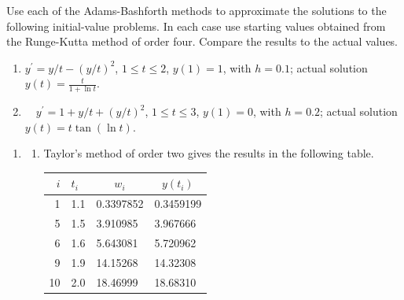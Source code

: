 \begin{posttest}
\item Use each of the Adams-Bashforth methods to approximate the solutions to the following initial-value problems. In each case use starting values obtained from the Runge-Kutta method of order four. Compare the results to the actual values.\\
\begin{enumerate}[label=(\alph*)]
\item $y^{\prime}=y / t-(y / t)^{2}$, $1 \leq t \leq 2$, $y(1)=1$, with $h=0.1$; actual solution $y(t)=\frac{t}{1+\ln t}$.\\
\item $\quad y^{\prime}=1+y / t+(y / t)^{2}$, $1 \leq t \leq 3$, $y(1)=0$, with $h=0.2$; actual solution $y(t)=t \tan (\ln t)$.
\end{enumerate}






\begin{mysolution}
\begin{enumerate}[label=\arabic*.]
\item 
\begin{enumerate}[label=(\alph*)]
\item Taylor's method of order two gives the results in the following table.

\begin{center}
\begin{tabular}{rlll}
\hline
$i$ & $t_{i}$ & \multicolumn{1}{c}{$w_{i}$} & \multicolumn{1}{c}{$y\left(t_{i}\right)$} \\
\hline
1 & 1.1 & 0.3397852 & 0.3459199 \\
5 & 1.5 & 3.910985 & 3.967666 \\
6 & 1.6 & 5.643081 & 5.720962 \\
9 & 1.9 & 14.15268 & 14.32308 \\
10 & 2.0 & 18.46999 & 18.68310 \\
\hline
\end{tabular}
\end{center}


\end{enumerate}
\end{enumerate}
\end{mysolution}
\end{posttest}
